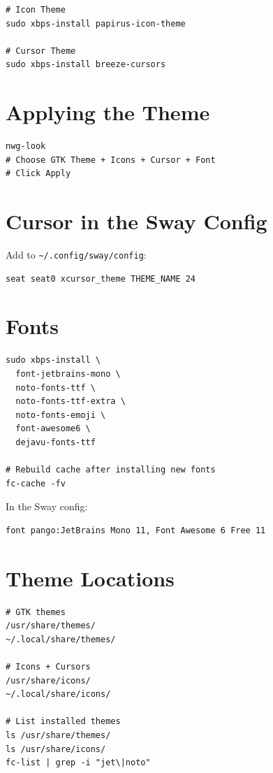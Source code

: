 \documentclass[12pt, a4paper]{book}
\begin{document}
\begin{lstlisting}
# Icon Theme
sudo xbps-install papirus-icon-theme

# Cursor Theme
sudo xbps-install breeze-cursors
\end{lstlisting}

\section{Applying the Theme}
\begin{lstlisting}
nwg-look
# Choose GTK Theme + Icons + Cursor + Font
# Click Apply
\end{lstlisting}

\section{Cursor in the Sway Config}

Add to \texttt{\textasciitilde/.config/sway/config}:
\begin{lstlisting}
seat seat0 xcursor_theme THEME_NAME 24
\end{lstlisting}

\section{Fonts}
\begin{lstlisting}
sudo xbps-install \
  font-jetbrains-mono \
  noto-fonts-ttf \
  noto-fonts-ttf-extra \
  noto-fonts-emoji \
  font-awesome6 \
  dejavu-fonts-ttf

# Rebuild cache after installing new fonts
fc-cache -fv
\end{lstlisting}

In the Sway config:
\begin{lstlisting}
font pango:JetBrains Mono 11, Font Awesome 6 Free 11
\end{lstlisting}

\section{Theme Locations}
\begin{lstlisting}
# GTK themes
/usr/share/themes/
~/.local/share/themes/

# Icons + Cursors
/usr/share/icons/
~/.local/share/icons/

# List installed themes
ls /usr/share/themes/
ls /usr/share/icons/
fc-list | grep -i "jet\|noto"
\end{lstlisting}
\end{document}
